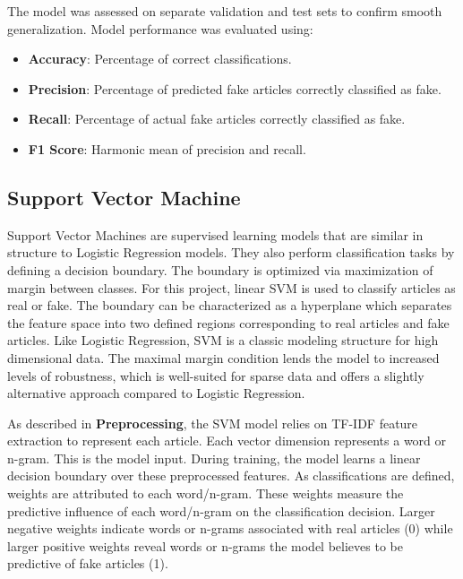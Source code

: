 \documentclass{article}
\begin{document}
The model was assessed on separate validation and test sets to confirm smooth generalization. Model performance was evaluated using:

\begin{itemize}
    \item \textbf{Accuracy}: Percentage of correct classifications.

    \item \textbf{Precision}: Percentage of predicted fake articles correctly classified as fake.

    \item \textbf{Recall}: Percentage of actual fake articles correctly classified as fake.

    \item \textbf{F1 Score}: Harmonic mean of precision and recall.
\end{itemize}

\subsection{Support Vector Machine}
Support Vector Machines are supervised learning models that are similar in structure to Logistic Regression models. They also perform classification tasks by defining a decision boundary. The boundary is optimized via maximization of margin between classes. For this project, linear SVM is used to classify articles as real or fake. The boundary can be characterized as a hyperplane which separates the feature space into two defined regions corresponding to real articles and fake articles. Like Logistic Regression, SVM is a classic modeling structure for high dimensional data. The maximal margin condition lends the model to increased levels of robustness, which is well-suited for sparse data and offers a slightly alternative approach compared to Logistic Regression. 

As described in \textbf{Preprocessing}, the SVM model relies on TF-IDF feature extraction to represent each article. Each vector dimension represents a word or n-gram. This is the model input. During training, the model learns a linear decision boundary over these preprocessed features. As classifications are defined, weights are attributed to each word/n-gram. These weights measure the predictive influence of each word/n-gram on the classification decision. Larger negative weights indicate words or n-grams associated with real articles (0) while larger positive weights reveal words or n-grams the model believes to be predictive of fake articles (1).
\end{document}
